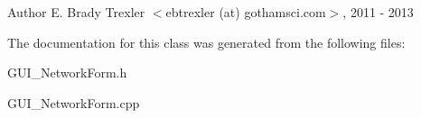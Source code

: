 \begin{DoxyAuthor}{Author}
E. Brady Trexler $<$ebtrexler (at) gothamsci.\+com$>$, 2011 -\/ 2013 
\end{DoxyAuthor}


The documentation for this class was generated from the following files\+:\begin{DoxyCompactItemize}
\item 
G\+U\+I\+\_\+\+Network\+Form.\+h\item 
G\+U\+I\+\_\+\+Network\+Form.\+cpp\end{DoxyCompactItemize}
